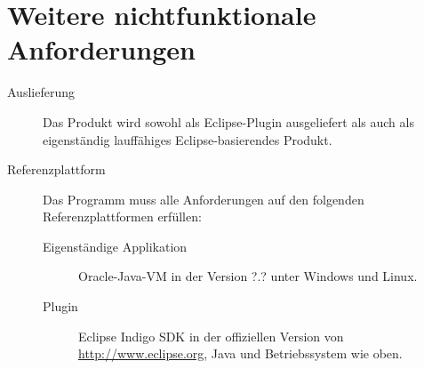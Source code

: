 \section{Weitere nichtfunktionale Anforderungen}%

\begin{description}%
    \item [Auslieferung] Das Produkt wird sowohl als Eclipse-Plugin ausgeliefert als auch als eigenständig lauffähiges Eclipse-basierendes Produkt.
    \item [Referenzplattform] Das Programm muss alle Anforderungen auf den folgenden Referenzplattformen erfüllen:
    \begin{description}
      \item [Eigenständige Applikation] Oracle-Java-VM in der Version ?.? unter Windows und Linux.
      \item [Plugin] Eclipse Indigo SDK in der offiziellen Version von \url{http://www.eclipse.org}, Java und Betriebssystem wie oben.
    \end{description}
\end{description}